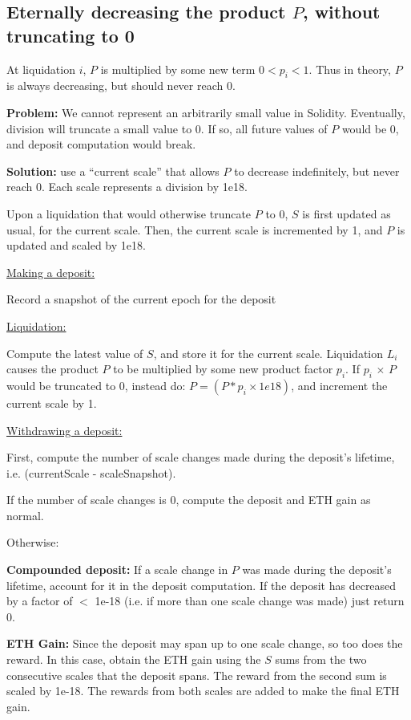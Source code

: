 \documentclass[reqno]{article}
\begin{document}
\bigskip
\subsection{Eternally decreasing the product $P$, without truncating to 0}

\bigskip
At liquidation $i$, $P$ is multiplied by some new term $0 < p_i <1$. Thus in theory, $P$ is always decreasing, but should never reach 0. 

\bigskip
\textbf{Problem:} We cannot represent an arbitrarily small value in Solidity.  Eventually, division will truncate a small value to 0. If so, all future values of $P$ would be 0, and deposit computation would break.

\bigskip
\textbf{Solution:} use a “current scale” that allows $P$ to decrease indefinitely, but never reach 0. Each scale represents a division by 1e18.  

\bigskip
Upon a liquidation that would otherwise truncate $P$ to 0, {$S$} is first updated as usual, for the current scale. Then, the current scale is incremented by 1, and {$P$} is updated and scaled by 1e18.

\bigskip
\underline{Making a deposit:}

Record a snapshot of the current epoch for the deposit

\bigskip
\underline{Liquidation:}

Compute the latest value of {$S$}, and store it for the current scale.
Liquidation {$L_i$} causes the product {$P$} to be multiplied by some new product factor {$p_i$}.  If {$p_i$} $\times$ {$P$} would be truncated to 0, instead do: $P = (P * p_i \times 1e18)$, and increment the current scale by 1.

\bigskip
\underline{Withdrawing a deposit:}

First, compute the number of scale changes made during the deposit’s lifetime, i.e. (currentScale - scaleSnapshot).

\bigskip
If the number of scale changes is 0, compute the deposit and ETH gain as normal.

\bigskip
Otherwise:

\bigskip
\textbf{Compounded deposit:} If a scale change in {$P$} was made during the deposit's lifetime, account for it in the deposit computation. If the deposit has decreased by a factor of $<$ 1e-18 (i.e. if more than one scale change was made) just return 0.

\bigskip
\textbf{ETH Gain:} Since the deposit may span up to one scale change, so too does the reward. In this case, obtain the ETH gain using the {$S$} sums from the two consecutive scales that the deposit spans. The reward from the second sum is scaled by 1e-18. The rewards from both scales are added to make the final ETH gain.
\end{document}
